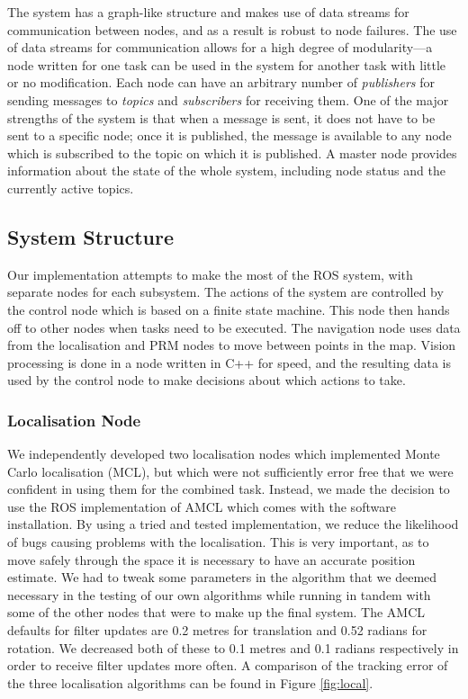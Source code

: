 \documentclass[conference]{IEEEtran}
\begin{document}
The system has a graph-like structure and makes use of data streams for communication between nodes, and as a result is robust to node failures. The use of data streams for communication allows for a high degree of modularity---a node written for one task can be used in the system for another task with little or no modification. Each node can have an arbitrary number of \emph{publishers} for sending messages to \emph{topics} and \emph{subscribers} for receiving them. One of the major strengths of the system is that when a message is sent, it does not have to be sent to a specific node; once it is published, the message is available to any node which is subscribed to the topic on which it is published. A  master node provides information about the state of the whole system, including node status and the currently active topics.

\subsection{System Structure}
Our implementation attempts to make the most of the ROS system, with separate nodes for each subsystem. The actions of the system are controlled by the control node which is based on a finite state machine. This node then hands off to other nodes when tasks need to be executed. The navigation node uses data from the localisation and PRM nodes to move between points in the map. Vision processing is done in a node written in C++ for speed, and the resulting data is used by the control node to make decisions about which actions to take.

\subsubsection{Localisation Node}
We independently developed two localisation nodes which implemented Monte Carlo localisation (MCL), but which were not sufficiently error free that we were confident in using them for the combined task. Instead, we made the decision to use the ROS implementation of AMCL which comes with the software installation. By using a tried and tested implementation, we reduce the likelihood of bugs causing problems with the localisation. This is very important, as to move safely through the space it is necessary to have an accurate position estimate. We had to tweak some parameters in the algorithm that we deemed necessary in the testing of our own algorithms while running in tandem with some of the other nodes that were to make up the final system. The AMCL defaults for filter updates are 0.2 metres for translation and 0.52 radians for rotation. We decreased both of these to 0.1 metres and 0.1 radians respectively in order to receive filter updates more often. A comparison of the tracking error of the three localisation algorithms can be found in Figure \ref{fig:local}.
\end{document}
